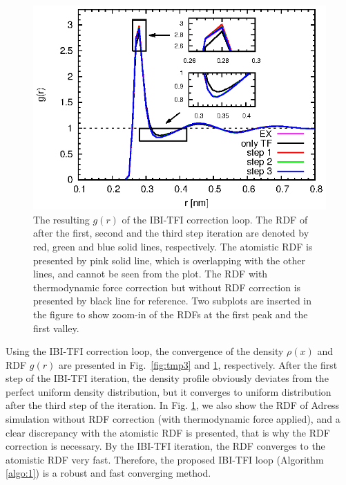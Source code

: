 \documentclass[aps,pre,preprint,unsortedaddress]{revtex4}
\begin{document}
\begin{figure}
  \centering
  \includegraphics{fig/rdf.eps}
  \caption{The resulting $g(r)$ of the IBI-TFI correction loop.  The
    RDF of after the first, second and the third step iteration are
    denoted by red, green and blue solid lines, respectively.  The
    atomistic RDF is presented by pink solid line, which is
    overlapping with the other lines, and cannot be seen from the
    plot. The RDF with thermodynamic force correction but without RDF
    correction is presented by black line for reference. Two subplots
    are inserted in the figure to show zoom-in of the RDFs at the
    first peak and the first valley.}
  \label{fig:tmp4}
\end{figure}

Using the IBI-TFI correction loop,
the convergence of the density $\rho(x)$ and RDF $g(r)$ are presented
in Fig.~\ref{fig:tmp3} and \ref{fig:tmp4}, respectively. After the
first step of the IBI-TFI iteration, the density profile obviously
deviates from the perfect uniform density distribution, but it
converges to uniform distribution after the third step of the
iteration. In Fig. \ref{fig:tmp4}, we also show the RDF of Adress
simulation without RDF correction (with thermodynamic force applied),
and a clear discrepancy with the atomistic RDF is presented,
that is why the RDF correction is necessary.  By
the IBI-TFI iteration, the RDF converges to the atomistic RDF very
fast. Therefore, the proposed IBI-TFI loop (Algorithm \ref{algo:1}) is
a robust and fast converging method.
\end{document}
